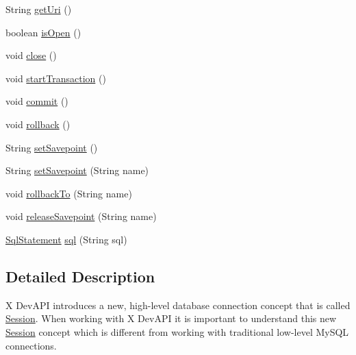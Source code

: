 \begin{DoxyCompactItemize}
\item 
String \mbox{\hyperlink{interfacecom_1_1mysql_1_1cj_1_1xdevapi_1_1_session_a8c5c670815d5fab8edb586c4a4e684ac}{get\+Uri}} ()
\item 
boolean \mbox{\hyperlink{interfacecom_1_1mysql_1_1cj_1_1xdevapi_1_1_session_a8054b47c7bdc370ab26b41ec9ba527a6}{is\+Open}} ()
\item 
void \mbox{\hyperlink{interfacecom_1_1mysql_1_1cj_1_1xdevapi_1_1_session_a20f640c1ca28e28d415a1927cbd67ee5}{close}} ()
\item 
void \mbox{\hyperlink{interfacecom_1_1mysql_1_1cj_1_1xdevapi_1_1_session_a1c0d0951a9c3f1d92f9bd22f337dd86c}{start\+Transaction}} ()
\item 
void \mbox{\hyperlink{interfacecom_1_1mysql_1_1cj_1_1xdevapi_1_1_session_ada6a17d457c7b1387c094862e465dc01}{commit}} ()
\item 
void \mbox{\hyperlink{interfacecom_1_1mysql_1_1cj_1_1xdevapi_1_1_session_a7c850a35b858307dd253bac93a187e8b}{rollback}} ()
\item 
String \mbox{\hyperlink{interfacecom_1_1mysql_1_1cj_1_1xdevapi_1_1_session_a4878e02a60bbf177ea77ab94c697cbbf}{set\+Savepoint}} ()
\item 
String \mbox{\hyperlink{interfacecom_1_1mysql_1_1cj_1_1xdevapi_1_1_session_a0729993f853b93bd8c819194aaa5f258}{set\+Savepoint}} (String name)
\item 
void \mbox{\hyperlink{interfacecom_1_1mysql_1_1cj_1_1xdevapi_1_1_session_a31dc4b454a765a159c591d5cc4f3d1cc}{rollback\+To}} (String name)
\item 
void \mbox{\hyperlink{interfacecom_1_1mysql_1_1cj_1_1xdevapi_1_1_session_ad372434e6431ce9a396a29d03f3ad8c4}{release\+Savepoint}} (String name)
\item 
\mbox{\hyperlink{interfacecom_1_1mysql_1_1cj_1_1xdevapi_1_1_sql_statement}{Sql\+Statement}} \mbox{\hyperlink{interfacecom_1_1mysql_1_1cj_1_1xdevapi_1_1_session_a4409e5c0f5917851f9875342b8d38b18}{sql}} (String sql)
\end{DoxyCompactItemize}


\subsection{Detailed Description}
X Dev\+A\+PI introduces a new, high-\/level database connection concept that is called \mbox{\hyperlink{interfacecom_1_1mysql_1_1cj_1_1xdevapi_1_1_session}{Session}}. When working with X Dev\+A\+PI it is important to understand this new \mbox{\hyperlink{interfacecom_1_1mysql_1_1cj_1_1xdevapi_1_1_session}{Session}} concept which is different from working with traditional low-\/level My\+S\+QL connections. 

